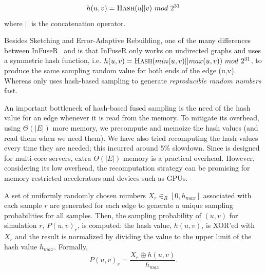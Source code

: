 \documentclass[final,5p,times,twocolumn]{elsarticle}
\newcommand\acro{{\sc{HyperFuseR\xspace}\xspace}\xspace}
\newcommand\fixme[1]{#1}
\begin{document}
\begin{equation}
    \label{eq:hash}
    h(u,v) = \mbox{{\sc Hash}}(u||v)~mod~2^{31}  
\end{equation} %
where $||$ is the concatenation operator. 

Besides Sketching and Error-Adaptive Rebuilding, one of the many differences between {\sc InFuseR}~\cite{infuser} and \acro is that {\sc InFuseR} only works on undirected graphs and uses a symmetric hash function, i.e. $h(u,v) = \mbox{{\sc Hash}}(min(u,v)||max(u,v))~mod~2^{31}$, to produce the same sampling random value for both ends of the edge (u,v). Whereas \acro only uses hash-based sampling to generate {\em reproducible random numbers} fast.

An important bottleneck of hash-based fused sampling is the need of the hash value for an edge whenever it is read from the memory. To mitigate its overhead, using $\Theta(|E|)$ more memory, we precompute and memoize the hash values (and read them when we need them). We have also tried recomputing the hash values every time they are needed; this incurred around $5\%$ slowdown. Since {\acro} is designed for multi-core servers, extra $\Theta(|E|)$ memory is a practical overhead. However, considering its low overhead, the recomputation strategy can be promising for memory-restricted accelerators and devices such as GPUs. 


A set of uniformly \fixme{ randomly chosen numbers $X_r \in_R [0, h_{max}]$ } associated with each sample $r$ are generated for each edge to generate a unique sampling probabilities for all samples. Then, the sampling probability of $(u, v)$ for simulation $r$, $P(u, v)_r$, is computed: the hash value, $h(u,v)$, is XOR'ed with  $X_r$ and the result is normalized by dividing the value to the upper limit of the hash value $h_{max}$. Formally,
\begin{equation}
    \label{eq:hash_prob}
    P(u,v)_r = \frac{X_r \oplus h(u,v)}{h_{max}}.
\end{equation}
\end{document}
